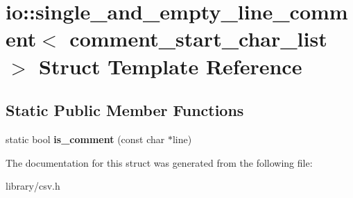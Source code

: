 \hypertarget{structio_1_1single__and__empty__line__comment}{}\section{io\+:\+:single\+\_\+and\+\_\+empty\+\_\+line\+\_\+comment$<$ comment\+\_\+start\+\_\+char\+\_\+list $>$ Struct Template Reference}
\label{structio_1_1single__and__empty__line__comment}
\subsection*{Static Public Member Functions}
\begin{DoxyCompactItemize}
\item 
\mbox{\label{structio_1_1single__and__empty__line__comment_a93a1556dfe4d7e6e3a674d576c4b30f4}} 
static bool {\bfseries is\+\_\+comment} (const char $\ast$line)
\end{DoxyCompactItemize}


The documentation for this struct was generated from the following file\+:\begin{DoxyCompactItemize}
\item 
library/csv.\+h\end{DoxyCompactItemize}
